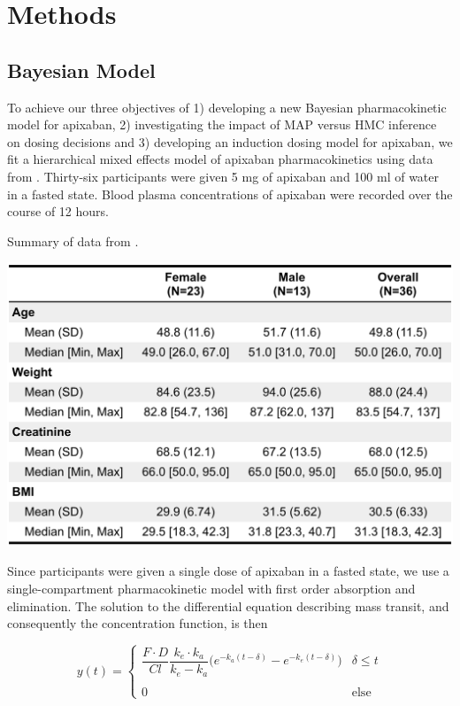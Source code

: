 \section{Methods}

\subsection*{Bayesian Model}

To achieve our three objectives of 1) developing a new Bayesian pharmacokinetic model for apixaban, 2) investigating the impact of MAP versus HMC inference on dosing decisions and 3) developing an induction dosing model for apixaban, we fit a hierarchical mixed effects model of apixaban pharmacokinetics using data from \cite{Beaton2018-el}.  Thirty-six participants were given 5 mg of apixaban and 100 ml of water in a fasted state. Blood plasma concentrations of apixaban were recorded over the course of 12 hours.



\begin{table}[htb]
	\centering
	\caption{Summary of data from  \cite{Beaton2018-el}. } 
	\label{tab:my table} 
	\includegraphics[width=0.7\linewidth]{figures/table1}
\end{table}


\noindent Since participants were given a single dose of apixaban in a fasted state, we use a single-compartment pharmacokinetic model with first order absorption and elimination.  The solution to the differential equation describing mass transit, and consequently the concentration function, is then


\begin{equation} \label{eq:eq_1}
y(t) =  \begin{cases}  \dfrac{F \cdot D}{\mathit{Cl}} \dfrac{k_e \cdot k_a}{k_e - k_a}\Bigg( e^{-k_a (t-\delta)} - e^{-k_e(t-\delta)} \Bigg)  & \delta \leq t\\\\ 0 & \mbox{else} \end{cases}
\end{equation}

